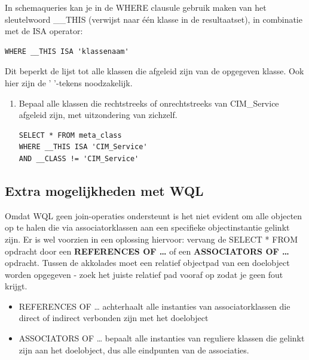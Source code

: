 \documentclass[11pt,a4paper]{report}
\begin{document}
In schemaqueries kan je in de WHERE clausule gebruik maken van het sleutelwoord \_\_THIS (verwijst naar één klasse in de resultaatset), in combinatie met de ISA operator:
\begin{lstlisting}
WHERE __THIS ISA 'klassenaam'
\end{lstlisting}
Dit beperkt de lijst tot alle klassen die afgeleid zijn van de opgegeven klasse. Ook hier zijn de ' '-tekens noodzakelijk.
\begin{enumerate}[resume]
	\item Bepaal alle klassen die rechtstreeks of onrechtstreeks van CIM\_Service afgeleid zijn, met uitzondering van zichzelf.
	\begin{lstlisting}
SELECT * FROM meta_class
WHERE __THIS ISA 'CIM_Service'
AND __CLASS != 'CIM_Service'
	\end{lstlisting}
\end{enumerate}
\subsection{Extra mogelijkheden met WQL}
Omdat WQL geen join-operaties ondersteunt is het niet evident om alle objecten op te halen die via associatorklassen aan een specifieke objectinstantie gelinkt zijn.
Er is wel voorzien in een oplossing hiervoor: vervang de SELECT * FROM opdracht door een \textbf{REFERENCES OF {…}} of een \textbf{ASSOCIATORS OF {…}} opdracht. Tussen de akkolades moet een relatief objectpad van een doelobject worden opgegeven - zoek het juiste relatief pad vooraf op zodat je geen fout krijgt.
\begin{itemize}
	\item REFERENCES OF {…} achterhaalt alle instanties van associatorklassen die direct of indirect verbonden zijn met het doelobject
	\item ASSOCIATORS OF {…} bepaalt alle instanties van reguliere klassen die gelinkt zijn aan het doelobject, dus alle eindpunten van de associaties.
\end{itemize}
\end{document}
